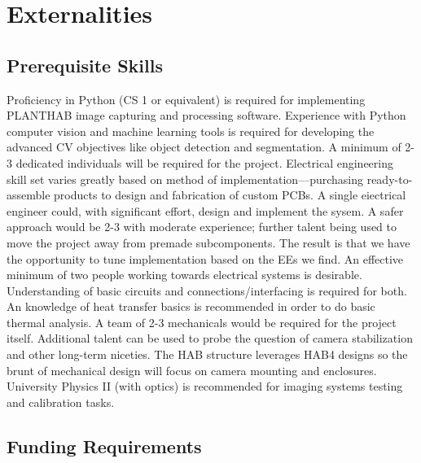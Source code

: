 \documentclass[conference]{IEEEtran} %
\begin{document}
\section{Externalities}
\subsection{Prerequisite Skills}
Proficiency in Python (CS 1 or equivalent) is required for implementing PLANTHAB image capturing and processing software.
Experience with Python computer vision and machine learning tools is required for developing the advanced CV objectives like object detection and segmentation. A minimum of 2-3 dedicated individuals will be required for the project.
Electrical engineering skill set varies greatly based on method of implementation---purchasing ready-to-assemble products to design and fabrication of custom PCBs. A single eiectrical engineer could, with significant effort, design and implement the sysem. A safer approach would be 2-3 with moderate experience; further talent being used to move the project away from premade subcomponents.
The result is that we have the opportunity to tune implementation based on the EEs we find. An effective minimum of two people working towards electrical systems is desirable.
Understanding of basic circuits and connections/interfacing is required for both.
An knowledge of heat transfer basics is recommended in order to do basic thermal analysis. A team of 2-3 mechanicals would be required for the project itself. Additional talent can be used to probe the question of camera stabilization and other long-term niceties.
The HAB structure leverages HAB4 designs so the brunt of mechanical design will focus on camera mounting and enclosures.
University Physics II (with optics) is recommended for imaging systems testing and calibration tasks.

\subsection{Funding Requirements}
\label{funding}

\end{document}
